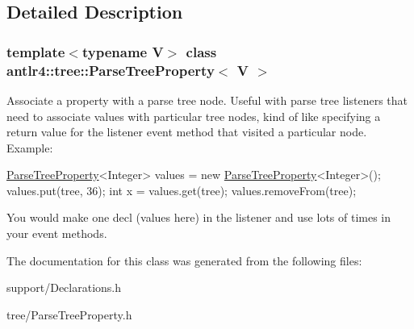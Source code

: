 \subsection{Detailed Description}
\subsubsection*{template$<$typename V$>$\newline
class antlr4\+::tree\+::\+Parse\+Tree\+Property$<$ V $>$}

Associate a property with a parse tree node. Useful with parse tree listeners that need to associate values with particular tree nodes, kind of like specifying a return value for the listener event method that visited a particular node. Example\+: 


\begin{DoxyPre}
\hyperlink{classantlr4_1_1tree_1_1ParseTreeProperty}{ParseTreeProperty}<Integer> values = new \hyperlink{classantlr4_1_1tree_1_1ParseTreeProperty}{ParseTreeProperty}<Integer>();
values.put(tree, 36);
int x = values.get(tree);
values.removeFrom(tree);
\end{DoxyPre}


You would make one decl (values here) in the listener and use lots of times in your event methods. 

The documentation for this class was generated from the following files\+:\begin{DoxyCompactItemize}
\item 
support/Declarations.\+h\item 
tree/Parse\+Tree\+Property.\+h\end{DoxyCompactItemize}
